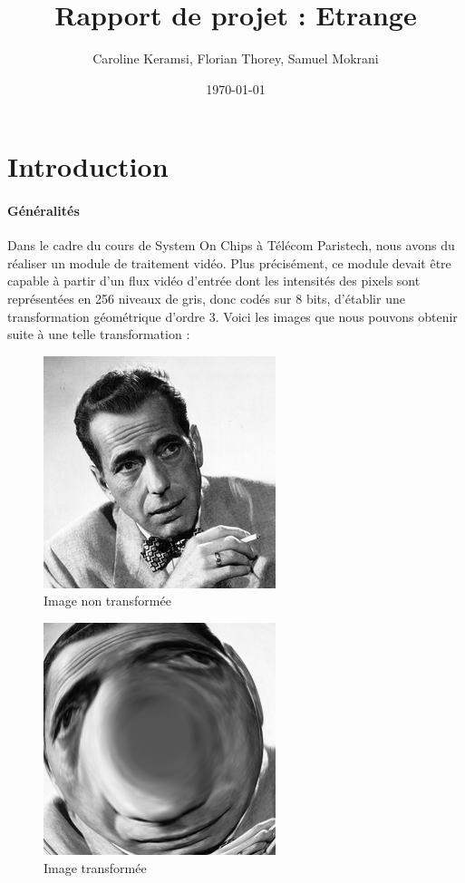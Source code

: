 \documentclass[a4paper,12pt]{report}
\title{Rapport de projet : Etrange}
\author {Caroline Keramsi, Florian Thorey, Samuel Mokrani}
\date{\today}
\begin{document}
\maketitle
\tableofcontents    %
\listoffigures        %

    \part{Introduction}

    \subsection{Généralités}

{Dans le cadre du cours de System On Chips à Télécom Paristech, nous avons du réaliser
un module de traitement vidéo. Plus précisément, ce module devait être capable à partir d'un flux vidéo d'entrée dont les intensités des pixels sont représentées en 256 niveaux de gris, donc codés sur 8 bits, d'établir une transformation géométrique d'ordre 3. Voici les images que nous pouvons obtenir suite à une telle transformation :}

\begin{figure}[!h]
	\centering
	\includegraphics[scale = 0.5]{bogart.png}
	\caption{Image non transformée}
\end{figure}

\begin{figure}[!h]
	\centering
	\includegraphics[scale = 0.5]{bogart_tr.png}
	\caption{Image transformée}
\end{figure}
\end{document}
